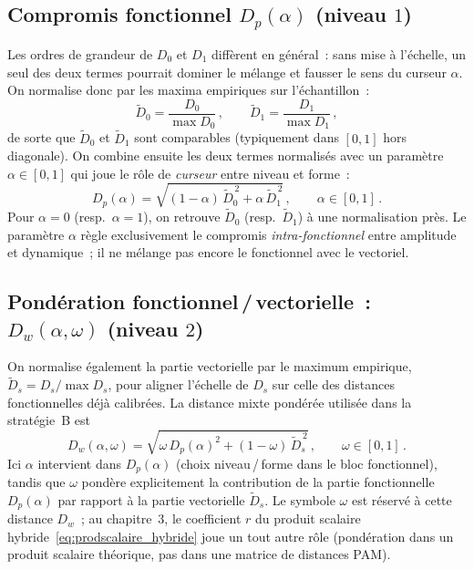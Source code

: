 \documentclass[11pt,a4paper]{article}
\newcommand{\Dw}{D_w}
\newcommand{\Dp}{D_p}
\begin{document}
\subsection{Compromis fonctionnel $\Dp(\alpha)$ (niveau $1$)}
Les ordres de grandeur de $D_0$ et $D_1$ diffèrent en général~: sans mise à l'échelle,
un seul des deux termes pourrait dominer le mélange et fausser le sens du curseur
$\alpha$. On normalise donc par les maxima empiriques sur l'échantillon~:
\begin{equation}
  \tilde{D}_0 = \frac{D_0}{\max D_0}\,,\qquad
  \tilde{D}_1 = \frac{D_1}{\max D_1}\,,
\end{equation}
de sorte que $\tilde{D}_0$ et $\tilde{D}_1$ sont comparables (typiquement dans
$[0,1]$ hors diagonale). On combine ensuite les deux termes normalisés avec un
paramètre $\alpha\in[0,1]$ qui joue le rôle de \emph{curseur} entre niveau et forme~:
\begin{equation}
  \label{eq:Dp}
  \Dp(\alpha) = \sqrt{(1-\alpha)\,\tilde{D}_0^{\,2} + \alpha\,\tilde{D}_1^{\,2}}\,,
  \qquad \alpha\in[0,1] \, .
\end{equation}
Pour $\alpha=0$ (resp.\ $\alpha=1$), on retrouve $\tilde{D}_0$ (resp.\
$\tilde{D}_1$) à une normalisation près. Le paramètre $\alpha$ règle
exclusivement le compromis \emph{intra-fonctionnel} entre amplitude et
dynamique~; il ne mélange pas encore le fonctionnel avec le vectoriel.

\subsection{Pondération fonctionnel\,/\,vectorielle~: $\Dw(\alpha,\omega)$
(niveau $2$)}
On normalise également la partie vectorielle par le maximum empirique,
$\tilde{D}_s = D_s / \max D_s$, pour aligner l'échelle de $D_s$ sur celle des
distances fonctionnelles déjà calibrées. La distance mixte pondérée utilisée
dans la stratégie~B est
\begin{equation}
  \label{eq:Dw}
  \Dw(\alpha,\omega)
  = \sqrt{\omega\,\Dp(\alpha)^2 + (1-\omega)\,\tilde{D}_s^{\,2}}\,,
  \qquad \omega\in[0,1] \, .
\end{equation}
Ici $\alpha$ intervient dans $\Dp(\alpha)$ (choix niveau\,/\,forme dans le
bloc fonctionnel), tandis que $\omega$ pondère explicitement la contribution
de la partie fonctionnelle $\Dp(\alpha)$ par rapport à la partie vectorielle
$\tilde{D}_s$. Le symbole $\omega$ est réservé à cette distance $\Dw$~; au chapitre~3, le
coefficient $r$ du produit scalaire hybride~\eqref{eq:prodscalaire_hybride} joue
un tout autre rôle (pondération dans un produit scalaire théorique, pas dans
une matrice de distances PAM).
\end{document}
